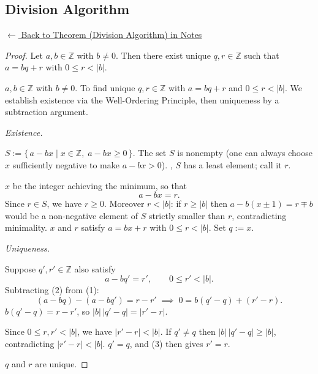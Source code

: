 
\subsection*{Division Algorithm}
\label{prf:division-algorithm}

\begin{remark*}[Return]
\hyperref[thm:division-algorithm]{$\leftarrow$ Back to Theorem (Division Algorithm) in Notes}
\end{remark*}

\begin{proof}
\Claim Let $a, b \in \mathbb{Z}$ with $b \neq 0$. Then there exist unique
$q, r \in \mathbb{Z}$ such that $a = bq + r$ with $0 \leq r < |b|$.

\Given $a, b \in \mathbb{Z}$ with $b \neq 0$.
\Goal To find unique $q, r \in \mathbb{Z}$ with $a = bq + r$ and $0 \leq r < |b|$.
\Strategy We establish existence via the Well-Ordering Principle, then uniqueness
by a subtraction argument.

\medskip
\noindent\textit{Existence.}

\medskip
\Let $S := \{\, a - bx \mid x \in \mathbb{Z},\; a - bx \geq 0 \,\}$.
The set $S$ is nonempty (one can always choose $x$ sufficiently negative to make
$a - bx > 0$).
, $S$ has a least element; call it $r$.

\Let $x$ be the integer achieving the minimum, so that
\begin{equation}
  a - bx = r. \tag{1}
\end{equation}
Since $r \in S$, we have $r \geq 0$. Moreover $r < |b|$: if $r \geq |b|$ then
$a - b(x \pm 1) = r \mp b$ would be a non-negative element of $S$ strictly
smaller than $r$, contradicting minimality.
\Therefore $x$ and $r$ satisfy $a = bx + r$ with $0 \leq r < |b|$.
Set $q := x$.

\medskip
\noindent\textit{Uniqueness.}

\medskip
Suppose $q', r' \in \mathbb{Z}$ also satisfy
\begin{equation}
  a - bq' = r', \qquad 0 \leq r' < |b|. \tag{2}
\end{equation}
Subtracting (2) from (1):
\[
  (a - bq) - (a - bq') = r - r'
  \;\implies\;
  0 = b(q' - q) + (r' - r). \tag{3}
\]
\Therefore $b(q' - q) = r - r'$, so $|b|\,|q' - q| = |r' - r|$.

Since $0 \leq r, r' < |b|$, we have $|r' - r| < |b|$.
If $q' \neq q$ then $|b|\,|q' - q| \geq |b|$, contradicting $|r' - r| < |b|$.
\Therefore $q' = q$, and (3) then gives $r' = r$.

\Hence $q$ and $r$ are unique. \AsReq
\end{proof}

